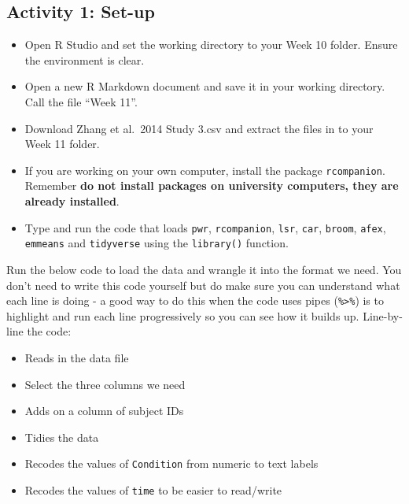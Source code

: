 \documentclass[]{book}
\providecommand{\tightlist}{%
  \setlength{\itemsep}{0pt}\setlength{\parskip}{0pt}}
\begin{document}
\hypertarget{activity-1-set-up-11}{%
\subsection{Activity 1: Set-up}\label{activity-1-set-up-11}}

\begin{itemize}
\tightlist
\item
  Open R Studio and set the working directory to your Week 10 folder. Ensure the environment is clear.
\item
  Open a new R Markdown document and save it in your working directory. Call the file ``Week 11''.
\item
  Download Zhang et al.~2014 Study 3.csv and extract the files in to your Week 11 folder.
\item
  If you are working on your own computer, install the package \texttt{rcompanion}. Remember \textbf{do not install packages on university computers, they are already installed}.
\item
  Type and run the code that loads \texttt{pwr}, \texttt{rcompanion}, \texttt{lsr}, \texttt{car}, \texttt{broom}, \texttt{afex}, \texttt{emmeans} and \texttt{tidyverse} using the \texttt{library()} function.
\end{itemize}

Run the below code to load the data and wrangle it into the format we need. You don't need to write this code yourself but do make sure you can understand what each line is doing - a good way to do this when the code uses pipes (\texttt{\%\textgreater{}\%}) is to highlight and run each line progressively so you can see how it builds up. Line-by-line the code:

\begin{itemize}
\tightlist
\item
  Reads in the data file
\item
  Select the three columns we need\\
\item
  Adds on a column of subject IDs\\
\item
  Tidies the data
\item
  Recodes the values of \texttt{Condition} from numeric to text labels
\item
  Recodes the values of \texttt{time} to be easier to read/write
\end{itemize}
\end{document}

